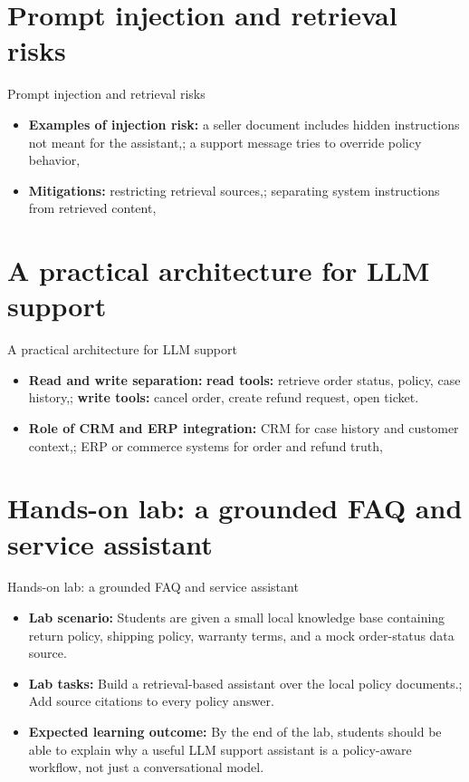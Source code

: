 \documentclass[aspectratio=169]{beamer}
\begin{document}
\section{Prompt injection and retrieval risks}

\begin{frame}{Prompt injection and retrieval risks}
  \begin{itemize}
    \item \textbf{Examples of injection risk:} a seller document includes hidden instructions not meant for the assistant,; a support message tries to override policy behavior,
    \item \textbf{Mitigations:} restricting retrieval sources,; separating system instructions from retrieved content,
  \end{itemize}
\end{frame}

\section{A practical architecture for LLM support}

\begin{frame}{A practical architecture for LLM support}
  \begin{itemize}
    \item \textbf{Read and write separation:} \textbf{read tools:} retrieve order status, policy, case history,; \textbf{write tools:} cancel order, create refund request, open ticket.
    \item \textbf{Role of CRM and ERP integration:} CRM for case history and customer context,; ERP or commerce systems for order and refund truth,
  \end{itemize}
\end{frame}

\section{Hands-on lab: a grounded FAQ and service assistant}

\begin{frame}{Hands-on lab: a grounded FAQ and service assistant}
  \begin{itemize}
    \item \textbf{Lab scenario:} Students are given a small local knowledge base containing return policy, shipping policy, warranty terms, and a mock order-status data source.
    \item \textbf{Lab tasks:} Build a retrieval-based assistant over the local policy documents.; Add source citations to every policy answer.
    \item \textbf{Expected learning outcome:} By the end of the lab, students should be able to explain why a useful LLM support assistant is a policy-aware workflow, not just a conversational model.
  \end{itemize}
\end{frame}
\end{document}
